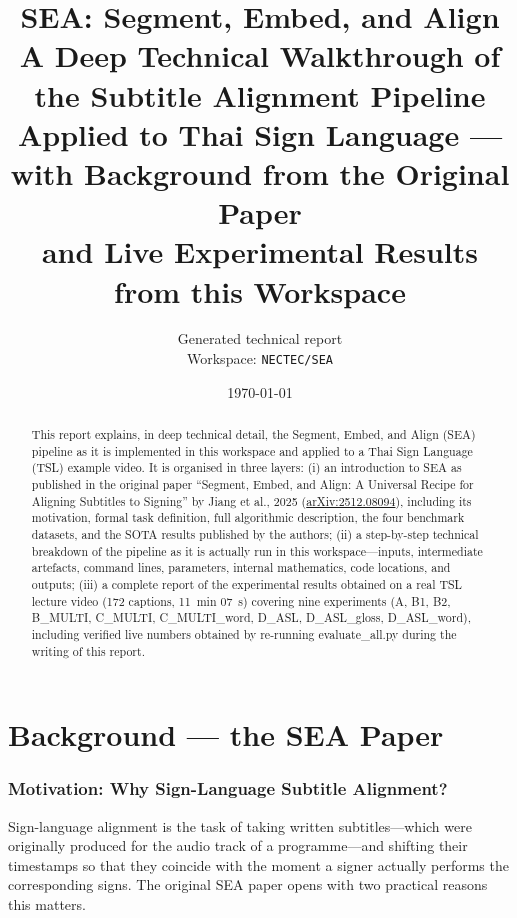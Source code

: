 \documentclass[11pt,a4paper]{article}
\title{\textbf{SEA: Segment, Embed, and Align} \\[6pt]
       \large A Deep Technical Walkthrough of the Subtitle Alignment Pipeline \\
       Applied to Thai Sign Language --- with Background from the Original Paper \\
       and Live Experimental Results from this Workspace}
\author{Generated technical report \\
        Workspace: \texttt{NECTEC/SEA}}
\date{\today}
\def\texttt#1{#1}%
\def\textbf#1{#1}%
\def\emph#1{#1}%
\begin{document}
\maketitle

\begin{abstract}
\noindent
This report explains, in deep technical detail, the \emph{Segment, Embed, and
Align} (SEA) pipeline as it is implemented in this workspace and applied to a
Thai Sign Language (TSL) example video. It is organised in three layers:
\textbf{(i)} an introduction to SEA as published in the original paper
\emph{``Segment, Embed, and Align: A Universal Recipe for Aligning Subtitles to
Signing''} by Jiang et al., 2025
(\href{https://arxiv.org/abs/2512.08094}{arXiv:2512.08094}), including its
motivation, formal task definition, full algorithmic description, the four
benchmark datasets, and the SOTA results published by the authors;
\textbf{(ii)} a step-by-step technical breakdown of the pipeline as it is
actually run in this workspace---inputs, intermediate artefacts, command
lines, parameters, internal mathematics, code locations, and outputs;
\textbf{(iii)} a complete report of the experimental results obtained on a real
TSL lecture video (172 captions, 11~min 07~s) covering nine experiments
(\texttt{A}, \texttt{B1}, \texttt{B2}, \texttt{B\_MULTI}, \texttt{C\_MULTI},
\texttt{C\_MULTI\_word}, \texttt{D\_ASL}, \texttt{D\_ASL\_gloss},
\texttt{D\_ASL\_word}), including verified live numbers obtained by re-running
\texttt{evaluate\_all.py} during the writing of this report.
\end{abstract}

\tableofcontents
\clearpage

\part{Background --- the SEA Paper}

\section{Motivation: Why Sign-Language Subtitle Alignment?}
\label{sec:motivation}

Sign-language alignment is the task of taking written subtitles---which were
originally produced for the audio track of a programme---and shifting their
timestamps so that they coincide with the moment a signer actually performs
the corresponding signs. The original SEA paper opens with two practical
reasons this matters.
\end{document}

